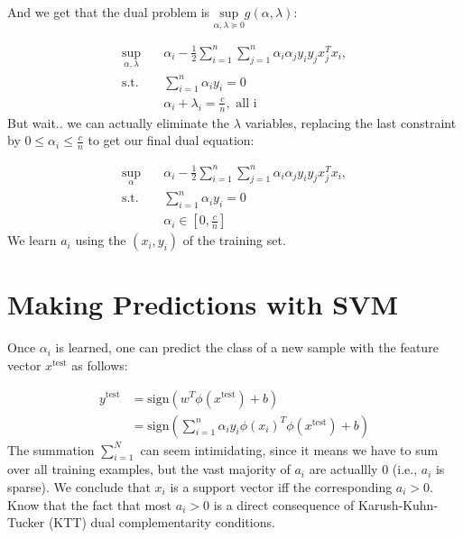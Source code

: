 \documentclass[12pt]{article}
\begin{document}
And we get that the dual problem is $\underset{\alpha,\lambda \succcurlyeq 0}{\text{sup}}g(\alpha,\lambda)$:

\begin{equation}
    \begin{aligned}
    \underset{\alpha,\lambda}{\text{sup}} \quad & \alpha_{i} - \frac{1}{2} \sum_{i=1}^{n} \sum_{j=1}^{n} \alpha_{i}\alpha_{j}y_{i}y_{j}x_{j}^{T}x_{i},\\
    \textrm{s.t.} \quad & \sum_{i=1}^{n} \alpha_{i}y_{i} = 0  \\
    & \alpha_{i} + \lambda_{i} = \frac{c}{n}, \text{  all i}
    \end{aligned}
    \end{equation}
But wait.. we can actually eliminate the $\lambda$ variables, replacing the last constraint by $0 \leq \alpha_{i} \leq \frac{c}{n}$ to get our final dual equation:

\begin{equation}
    \begin{aligned}
    \underset{\alpha}{\text{sup}} \quad & \alpha_{i} - \frac{1}{2} \sum_{i=1}^{n} \sum_{j=1}^{n} \alpha_{i}\alpha_{j}y_{i}y_{j}x_{j}^{T}x_{i},\\
    \textrm{s.t.} \quad & \sum_{i=1}^{n} \alpha_{i}y_{i} = 0  \\
    & \alpha_{i} \in [0,\frac{c}{n}]
    \end{aligned}
    \end{equation}
We learn $a_{i}$ using the $(x_{i},y_{i})$ of the training set.
\section{Making Predictions with SVM}
Once $\alpha_{i}$ is learned, one can predict the class of a new sample with the feature vector $x^{\text{test}}$ as follows:

\begin{equation}
\begin{split}
y^{\text{test}} & = \text{sign}(w^{T}\phi(x^{\text{test}}) + b) \\
 & = \text{sign}(\sum_{i=1}^{n} \alpha_{i}y_{i} \phi(x_{i})^{T}\phi(x^{\text{test}}) + b)
\end{split}
\end{equation}
The summation $\sum_{i=1}^{N}$ can seem intimidating, since it means we have to sum over all training examples, but the vast majority of $a_{i}$ are actuallly 0 (i.e., $a_{i}$ is sparse). We conclude that $x_{i}$ is a support vector iff the corresponding $a_{i} > 0$. Know that the fact that most $a_{i} > 0$ is a direct consequence of Karush-Kuhn-Tucker (KTT) dual complementarity conditions.
\end{document}
